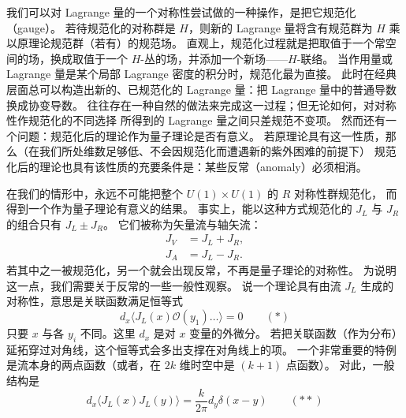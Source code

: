 我们可以对 Lagrange 量的一个对称性尝试做的一种操作，是把它规范化（gauge）。
若待规范化的对称群是 $H$，则新的 Lagrange 量将含有规范群为 $H$ 乘以原理论规范群（若有）的规范场。
直观上，规范化过程就是把取值于一个常空间的场，换成取值于一个 $H$-丛的场，并添加一个新场——$H$-联络。
当作用量或 Lagrange 量是某个局部 Lagrange 密度的积分时，规范化最为直接。
此时在经典层面总可以构造出新的、已规范化的 Lagrange 量：把 Lagrange 量中的普通导数换成协变导数。
往往存在一种自然的做法来完成这一过程；但无论如何，对对称性作规范化的不同选择
所得到的 Lagrange 量之间只差规范不变项。
然而还有一个问题：规范化后的理论作为量子理论是否有意义。
若原理论具有这一性质，那么（在我们所处维数足够低、不会因规范化而遭遇新的紫外困难的前提下）
规范化后的理论也具有该性质的充要条件是：某些反常（anomaly）必须相消。

在我们的情形中，永远不可能把整个 $U(1)\times U(1)$ 的 $R$ 对称性群规范化，
而得到一个作为量子理论有意义的结果。
事实上，能以这种方式规范化的 $J_L$ 与 $J_R$ 的组合只有 $J_L\pm J_R$。
它们被称为矢量流与轴矢流：
\[
\begin{aligned}
J_V &= J_L+J_R,\\
J_A &= J_L-J_R.
\end{aligned}
\]
若其中之一被规范化，另一个就会出现反常，不再是量子理论的对称性。
为说明这一点，我们需要关于反常的一些一般性观察。
说一个理论具有由流 $J_L$ 生成的对称性，意思是关联函数满足恒等式
\[
d_x\bigl\langle J_L(x)\mathcal{O}(y_1)\dots\bigr\rangle=0 \qquad (\ast)
\]
只要 $x$ 与各 $y_i$ 不同。这里 $d_x$ 是对 $x$ 变量的外微分。
若把关联函数（作为分布）延拓穿过对角线，这个恒等式会多出支撑在对角线上的项。
一个非常重要的特例是流本身的两点函数（或者，在 $2k$ 维时空中是 $(k+1)$ 点函数）。
对此，一般结构是
\[
d_x\bigl\langle J_L(x)J_L(y)\bigr\rangle=\frac{k}{2\pi}d_y\delta(x-y) \qquad (\ast\ast)
\]



